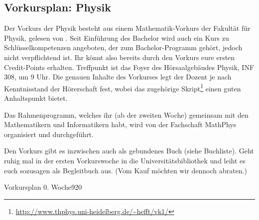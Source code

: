 \subsection*{\Large Vorkursplan: Physik}
\addtocounter{section}{1}
Der Vorkurs der Physik besteht aus einem Mathematik-Vorkurs der Fakultät für
Physik, gelesen von \dozentvorkurs. Seit Einführung des Bachelor wird auch ein
Kurs zu Schlüsselkompetenzen angeboten, der zum Bachelor-Programm gehört,
jedoch nicht verpflichtend ist. Ihr könnt also bereits durch den Vorkurs eure
ersten Credit-Points erhalten. Treffpunkt ist das Foyer des Hörsaalgebäudes
Physik, \Gls{INF} 308, um 9 Uhr. Die genauen Inhalte des Vorkurses legt der
Dozent je nach Kenntnisstand der Hörerschaft fest, wobei das zugehörige
Skript\footnote{\url{http://www.thphys.uni-heidelberg.de/~hefft/vk1/}} einen
guten Anhaltspunkt bietet.

Das Rahmenprogramm, welches ihr (ab der zweiten Woche) gemeinsam mit den Mathematikern und Informatikern habt, wird von der Fachschaft MathPhys organisiert und durchgeführt.%

Den Vorkurs gibt es inzwischen auch als gebundenes Buch (siehe Buchliste). Geht ruhig mal in der ersten Vorkurswoche in die Universitätsbibliothek und leiht es euch sozusagen als Begleitbuch aus. (Vom Kauf möchten wir dennoch abraten.)

\begin{stundenplan}{Vorkursplan 0. Woche}{9}{20}





\end{stundenplan}

